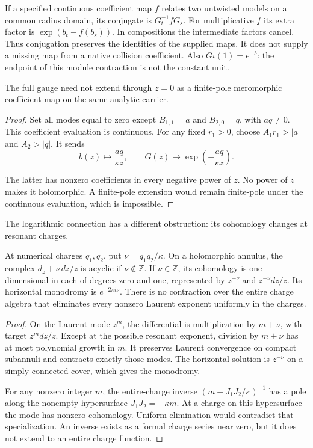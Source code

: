 If a specified continuous coefficient map $f$ relates
two untwisted models on a common radius domain, its
conjugate is $G_t^{-1}fG_s$. For multiplicative $f$ its
extra factor is $\exp(b_t-f(b_s))$. In compositions the
intermediate factors cancel. Thus conjugation preserves
the identities of the supplied maps. It does not supply
a missing map from a native collision coefficient.
Also $G\iota(1)=e^{-b}$: the endpoint of this module
contraction is not the constant unit.

\begin{proposition}\label{cbc:ac:essential}
The full gauge need not extend through $z=0$ as a
finite-pole meromorphic coefficient map on the same
analytic carrier.
\end{proposition}
\begin{proof}
Set all modes equal to zero except $B_{1,1}=a$ and
$B_{2,0}=q$, with $aq\ne0$. This coefficient evaluation
is continuous. For any fixed $r_1>0$, choose
$A_1r_1>|a|$ and $A_2>|q|$.
It sends
\[
 b(z)\longmapsto\frac{aq}{\kappa z},\qquad
 G(z)\longmapsto\exp\left(-\frac{aq}{\kappa z}\right).
\]

The latter has nonzero coefficients in every negative
power of $z$. No power of $z$ makes it holomorphic.
A finite-pole extension would remain finite-pole under
the continuous evaluation, which is impossible.
\end{proof}

The logarithmic connection has a different obstruction:
its cohomology changes at resonant charges.

\begin{proposition}\label{cbc:ac:resonance}
At numerical charges $q_1,q_2$, put $\nu=q_1q_2/\kappa$.
On a holomorphic annulus, the complex
$d_z+\nu\,dz/z$ is acyclic if $\nu\notin\mathbb Z$.
If $\nu\in\mathbb Z$, its cohomology is one-dimensional
in each of degrees zero and one, represented by
$z^{-\nu}$ and $z^{-\nu}dz/z$.
Its horizontal monodromy is $e^{-2\pi i\nu}$.
There is no contraction over the entire charge algebra
that eliminates every nonzero Laurent exponent uniformly
in the charges.
\end{proposition}
\begin{proof}
On the Laurent mode $z^m$, the differential is
multiplication by $m+\nu$, with target $z^m dz/z$.
Except at the possible resonant exponent, division by
$m+\nu$ has at most polynomial growth in $m$. It
preserves Laurent convergence on compact subannuli
and contracts exactly those modes. The horizontal
solution is $z^{-\nu}$ on a simply connected cover,
which gives the monodromy.

For any nonzero integer $m$, the entire-charge inverse
$(m+J_1J_2/\kappa)^{-1}$ has a pole along the nonempty
hypersurface $J_1J_2=-\kappa m$. At a charge on this
hypersurface the mode has nonzero cohomology.
Uniform elimination would contradict that specialization.
An inverse exists as a formal charge series near zero,
but it does not extend to an entire charge function.
\end{proof}

